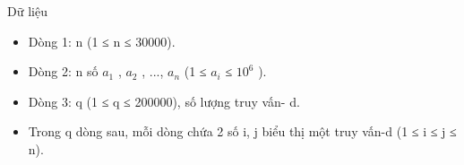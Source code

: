 Dữ liệu
\begin{itemize}
	\item     Dòng 1: n (1 ≤ n ≤ 30000).   
	\item     Dòng 2: n số $a_{1}$    , $a_{2}$    , ...,   $a_{n}$    (1 ≤ $a_{i}$    ≤   $10^{6}$    ).   
	\item     Dòng 3: q (1 ≤ q ≤ 200000), số lượng truy vấn-  d.   
	\item     Trong q dòng sau, mỗi dòng chứa 2 số i, j biểu thị một   truy vấn-d (1 ≤ i ≤ j ≤ n).   
\end{itemize}
